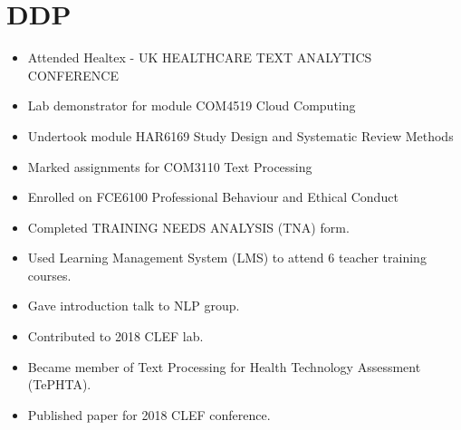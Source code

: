 \chapter{DDP} \label{lit}


\begin{itemize}
  \item Attended Healtex - UK HEALTHCARE TEXT ANALYTICS CONFERENCE
  \item Lab demonstrator for module COM4519 Cloud Computing
  \item Undertook module HAR6169 Study Design and Systematic Review Methods
  \item Marked assignments for COM3110 Text Processing
  \item Enrolled on FCE6100 Professional Behaviour and Ethical Conduct
  \item Completed TRAINING NEEDS ANALYSIS (TNA) form.
  \item Used Learning Management System (LMS) to attend 6 teacher training courses.
  \item Gave introduction talk to NLP group.
  \item Contributed to 2018 CLEF lab.
  \item Became member of Text Processing for Health Technology Assessment (TePHTA).
  \item Published paper for 2018 CLEF conference.
  
\end{itemize}
